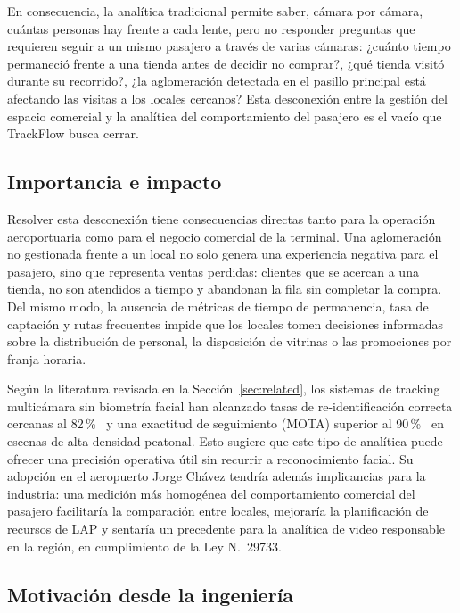 \documentclass[12pt,a4paper]{article}
\begin{document}
En consecuencia, la analítica tradicional permite saber, cámara por
cámara, cuántas personas hay frente a cada lente, pero no responder
preguntas que requieren seguir a un mismo pasajero a través de varias
cámaras: ¿cuánto tiempo permaneció frente a una tienda antes de decidir
no comprar?, ¿qué tienda visitó durante su recorrido?, ¿la aglomeración
detectada en el pasillo principal está afectando las visitas a los
locales cercanos? Esta desconexión entre la gestión del espacio comercial
y la analítica del comportamiento del pasajero es el vacío que TrackFlow
busca cerrar.

\subsection{Importancia e impacto}

Resolver esta desconexión tiene consecuencias directas tanto para la
operación aeroportuaria como para el negocio comercial de la terminal.
Una aglomeración no gestionada frente a un local no solo genera una
experiencia negativa para el pasajero, sino que representa ventas
perdidas: clientes que se acercan a una tienda, no son atendidos a tiempo
y abandonan la fila sin completar la compra. Del mismo modo, la ausencia
de métricas de tiempo de permanencia, tasa de captación y rutas
frecuentes impide que los locales tomen decisiones informadas sobre la
distribución de personal, la disposición de vitrinas o las promociones
por franja horaria.

Según la literatura revisada en la Sección~\ref{sec:related}, los
sistemas de tracking multicámara sin biometría facial han alcanzado tasas
de re-identificación correcta cercanas al 82\,\%~\cite{mendes2023} y una exactitud
de seguimiento (MOTA) superior al 90\,\%~\cite{yang2023} en escenas de alta densidad peatonal. Esto sugiere
que este tipo de analítica puede ofrecer una precisión operativa útil sin
recurrir a reconocimiento facial. Su adopción en el aeropuerto Jorge
Chávez tendría además implicancias para la industria: una medición más
homogénea del comportamiento comercial del pasajero facilitaría la
comparación entre locales, mejoraría la planificación de recursos de LAP
y sentaría un precedente para la analítica de video responsable en la
región, en cumplimiento de la Ley N.\textdegree~29733.

\subsection{Motivación desde la ingeniería}
\end{document}
